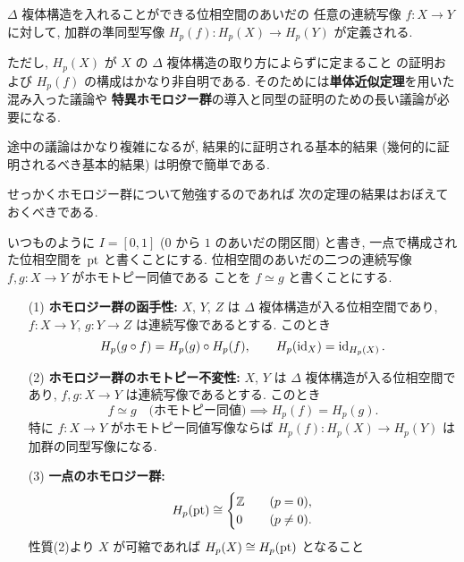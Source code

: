 \documentclass[12pt,twoside]{jarticle}
\begin{document}
$\Delta$ 複体構造を入れることができる位相空間のあいだの
任意の連続写像 $f:X\to Y$ に対して, 
加群の準同型写像 $H_p(f):H_p(X)\to H_p(Y)$ が定義される.

ただし, $H_p(X)$ が $X$ の $\Delta$ 複体構造の取り方によらずに定まること
の証明および $H_p(f)$ の構成はかなり非自明である.  
そのためには{\bf 単体近似定理}を用いた混み入った議論や
{\bf 特異ホモロジー群}の導入と同型の証明のための長い議論が必要になる.

途中の議論はかなり複雑になるが, 結果的に証明される基本的結果 
(幾何的に証明されるべき基本的結果) は明僚で簡単である.

せっかくホモロジー群について勉強するのであれば
次の定理の結果はおぼえておくべきである.

\begin{theorem}[ホモロジー群の基本性質]
  \label{theorem:homology-MV}
  いつものように $I=[0,1]$ ($0$ から $1$ のあいだの閉区間) と書き,
  一点で構成された位相空間を $\mathop{\mathrm{pt}}$ と書くことにする.
  位相空間のあいだの二つの連続写像 $f,g:X\to Y$ がホモトピー同値である
  ことを $f\simeq g$ と書くことにする.
  \begin{enumerate}
  \item[(1)] {\bf ホモロジー群の函手性:} 
    $X$, $Y$, $Z$ は $\Delta$ 複体構造が入る位相空間であり,
    $f:X\to Y$, $g:Y\to Z$ は連続写像であるとする. このとき
    \begin{equation*}
      H_p(g\circ f) = H_p(g)\circ H_p(f),
      \qquad
      H_p(\mathop{\mathrm{id}}\nolimits_X) = \mathop{\mathrm{id}}\nolimits_{H_p(X)}.
    \end{equation*}
  \item[(2)] {\bf ホモロジー群のホモトピー不変性:} 
    $X$, $Y$ は $\Delta$ 複体構造が入る位相空間であり,
    $f,g:X\to Y$ は連続写像であるとする. このとき
    \begin{equation*}
      f\simeq g \quad\text{(ホモトピー同値)}
      \implies H_p(f)=H_p(g).
    \end{equation*}
    特に $f:X\to Y$ がホモトピー同値写像ならば $H_p(f):H_p(X)\to H_p(Y)$ は
    加群の同型写像になる.
  \item[(3)] {\bf 一点のホモロジー群:} 
    \begin{equation*}
      H_p(\mathop{\mathrm{pt}}) \cong
      \begin{cases}
        {\mathbb Z} & \quad (p=0), \\
        0  & \quad (p\ne 0). \\
      \end{cases}
    \end{equation*}
    性質(2)より $X$ が可縮であれば $H_p(X)\cong H_p(\mathop{\mathrm{pt}})$ となること

\end{enumerate}
\end{theorem}
\end{document}
